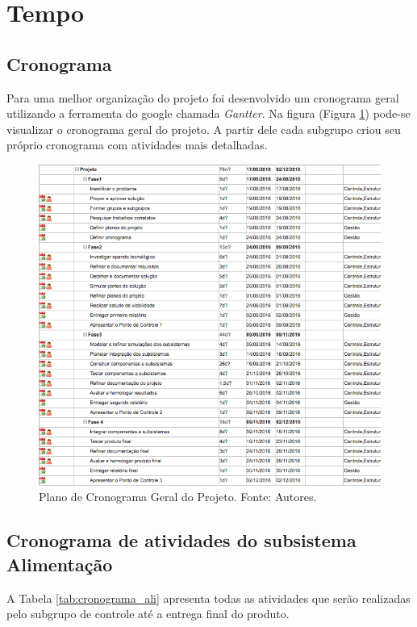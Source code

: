 \section{Tempo}

\subsection{Cronograma}

Para uma melhor organização do projeto foi desenvolvido um cronograma geral utilizando a ferramenta do google chamada \textit{Gantter}. Na figura (Figura \ref{fig:cronogramaGeral}) pode-se visualizar o cronograma geral do projeto. A partir dele cada subgrupo criou seu próprio cronograma com atividades mais detalhadas.

\begin{figure}[htpb!]
    \centering
    \includegraphics[scale= 0.7]{figuras/CronogramaGeral.png}
    \caption[Escopo]{Plano de Cronograma Geral do Projeto. Fonte: Autores.}
    \label{fig:cronogramaGeral}
\end{figure}

\newpage

\subsection{Cronograma de atividades do subsistema Alimentação}
A Tabela \ref{tab:cronograma_ali} apresenta todas as atividades que serão realizadas pelo subgrupo de controle até a entrega final do produto.

